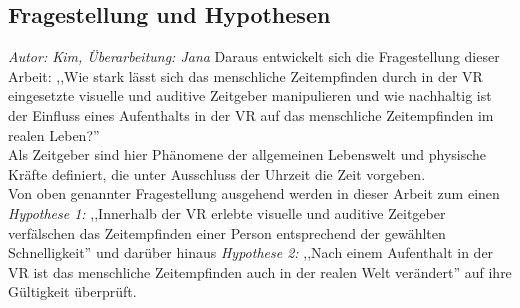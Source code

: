 \documentclass{Paper}
\begin{document}
\subsection{Fragestellung und Hypothesen}
\textit{Autor: Kim, Überarbeitung: Jana}
Daraus entwickelt sich die Fragestellung dieser Arbeit: ,,Wie stark lässt sich das menschliche Zeitempfinden durch in der VR eingesetzte visuelle und auditive Zeitgeber manipulieren und wie nachhaltig ist der Einfluss eines Aufenthalts in der VR auf das menschliche Zeitempfinden im realen Leben?''\\
Als Zeitgeber sind hier Phänomene der allgemeinen Lebenswelt und physische Kräfte definiert, die unter Ausschluss der Uhrzeit die Zeit vorgeben.\\
Von oben genannter Fragestellung ausgehend werden in dieser Arbeit zum einen \textit{Hypothese 1:} ,,Innerhalb der VR erlebte visuelle und auditive Zeitgeber verfälschen das Zeitempfinden einer Person entsprechend der gewählten Schnelligkeit'' und darüber hinaus \textit{Hypothese 2:} ,,Nach einem Aufenthalt in der VR ist das menschliche Zeitempfinden auch in der realen Welt verändert'' auf ihre Gültigkeit überprüft.
 

 


\end{document}
